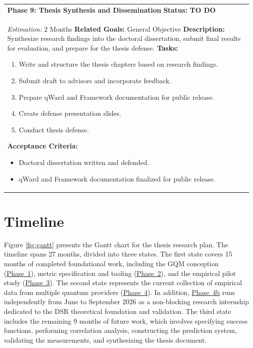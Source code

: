 \documentclass{article}
\begin{document}
\begin{longtable}{@{}p{\textwidth}@{}}
    \textbf{Phase 9: Thesis Synthesis and Dissemination} \label{p:9} \hfill \textbf{Status: TO DO} \\
    \textit{Estimation:} 2 Months \newline
    \textbf{Related Goals:} General Objective \newline
    \textbf{Description:} Synthesize research findings into the doctoral dissertation, submit final results for evaluation, and prepare for the thesis defense. \newline
    \textbf{Tasks:}
    \begin{enumerate}[label=T9.\arabic*, ref=T9.\arabic*, font=\bfseries, leftmargin=3.5em, labelindent=0pt, itemindent=0pt, labelsep=0.5em, noitemsep, topsep=0pt]
        \item \label{p9:t1} Write and structure the thesis chapters based on research findings.
        \item \label{p9:t2} Submit draft to advisors and incorporate feedback.
        \item \label{p9:t3} Prepare qWard and Framework documentation for public release.
        \item \label{p9:t4} Create defense presentation slides.
        \item \label{p9:t5} Conduct thesis defense.
    \end{enumerate}
    \textbf{Acceptance Criteria:}
    \begin{itemize}[leftmargin=1.5em, labelindent=0pt, itemindent=0pt, noitemsep, topsep=0pt]
        \item Doctoral dissertation written and defended.
        \item qWard and Framework documentation finalized for public release.
    \end{itemize} \\
    \bottomrule
    \end{longtable}

\section{Timeline}
\label{section:timeline}

Figure \ref{fig:gantt} presents the Gantt chart for the thesis research plan. The timeline spans 27 months, divided into three states. The first state covers 15 months of completed foundational work, including the GQM conception (\hyperref[p:1]{Phase~1}), metric specification and tooling (\hyperref[p:2]{Phase~2}), and the empirical pilot study (\hyperref[p:3]{Phase~3}). The second state represents the current collection of empirical data from multiple quantum providers (\hyperref[p:4]{Phase~4}). In addition, \hyperref[p:4b]{Phase~4b} runs independently from June to September 2026 as a non-blocking research internship dedicated to the DSR theoretical foundation and validation. The third state includes the remaining 9 months of future work, which involves specifying success functions, performing correlation analysis, constructing the prediction system, validating the measurements, and synthesizing the thesis document.
\end{document}
